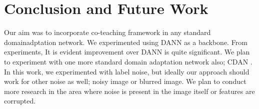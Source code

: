\section{Conclusion and Future Work}
Our aim was to incorporate co-teaching framework in any standard domainadptation network. We experimented using DANN as a backbone. From experiments, It is evident improvement over DANN is quite significant. We plan to experiment with one more standard domain adaptation network also; CDAN \cite{cdan}. In this work, we experimented with label noise, but ideally our approach should work for other noise as well; noisy image or blurred image. We plan to conduct more research in the area where noise is present in the image itself or features are corrupted.   





